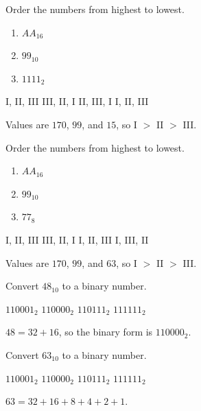 \newpage 

\question[5]
Order the numbers from highest to lowest.
\begin{enumerate}
  \renewcommand{\labelenumi}{\Roman{enumi}.}
  \item \(AA_{16}\)
  \item \(99_{10}\)
  \item \(1111_{2}\)
\end{enumerate}
\begin{choices}
  \choice I, II, III
  \choice III, II, I
  \choice II, III, I
  \CorrectChoice I, II, III
\end{choices}
\begin{solution}
  Values are \(170\), \(99\), and \(15\), so I \(>\) II \(>\) III.
\end{solution}

\question[5]
Order the numbers from highest to lowest.
\begin{enumerate}
  \renewcommand{\labelenumi}{\Roman{enumi}.}
  \item \(AA_{16}\)
  \item \(99_{10}\)
  \item \(77_{8}\)
\end{enumerate}
\begin{choices}
  \choice I, II, III
  \choice III, II, I
  \CorrectChoice I, II, III
  \choice I, III, II
\end{choices}
\begin{solution}
  Values are \(170\), \(99\), and \(63\), so I \(>\) II \(>\) III.
\end{solution}

\question[5]
Convert \(48_{10}\) to a binary number.
\begin{choices}
  \choice \(110001_{2}\)
  \CorrectChoice \(110000_{2}\)
  \choice \(110111_{2}\)
  \choice \(111111_{2}\)
\end{choices}
\begin{solution}
  \(48 = 32 + 16\), so the binary form is \(110000_{2}\).
\end{solution}

\question[5]
Convert \(63_{10}\) to a binary number.
\begin{choices}
  \choice \(110001_{2}\)
  \choice \(110000_{2}\)
  \choice \(110111_{2}\)
  \CorrectChoice \(111111_{2}\)
\end{choices}
\begin{solution}
  \(63 = 32 + 16 + 8 + 4 + 2 + 1\).
\end{solution}


